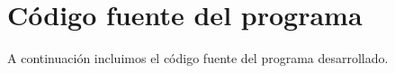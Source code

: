\section{C\'odigo fuente del programa}

A continuaci\'on incluimos el c\'odigo fuente del programa
desarrollado.\\

%

%
